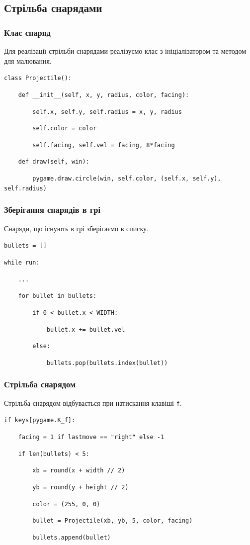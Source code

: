 \subsection{Стрільба снарядами}
\begin{frame}
\frametitle{Клас снаряд}
Для реалізації стрільби снарядами реалізуємо клас з ініціалізатором та методом для малювання.

\texttt{class Projectile():}

\texttt{~~~~def \_\_init\_\_(self, x, y, radius, color, facing):}

\texttt{~~~~~~~~self.x, self.y, self.radius = x, y, radius}

\texttt{~~~~~~~~self.color = color}

\texttt{~~~~~~~~self.facing, self.vel = facing, 8*facing}

\texttt{~~~~def draw(self, win):}

\texttt{~~~~~~~~pygame.draw.circle(win, self.color, (self.x, self.y), self.radius)}
\end{frame}

\begin{frame}
\frametitle{Зберігання снарядів в грі}
Снаряди, що існують в грі зберігаємо в списку.

\texttt{bullets = []}

\texttt{while run:}

\texttt{~~~~...}

\texttt{~~~~for bullet in bullets:}

\texttt{~~~~~~~~if 0 < bullet.x < WIDTH:}

\texttt{~~~~~~~~~~~~bullet.x += bullet.vel}

\texttt{~~~~~~~~else:}

\texttt{~~~~~~~~~~~~bullets.pop(bullets.index(bullet))}
\end{frame}

\begin{frame}
\frametitle{Стрільба снарядом}
Стрільба снарядом відбувається при натискання клавіші \texttt{f}.

\texttt{if keys[pygame.K\_f]:}

\texttt{~~~~facing = 1 if lastmove == "right"~else -1}

\texttt{~~~~if len(bullets) < 5:}

\texttt{~~~~~~~~xb = round(x + width // 2)}

\texttt{~~~~~~~~yb = round(y + height // 2)}

\texttt{~~~~~~~~color = (255, 0, 0)}

\texttt{~~~~~~~~bullet = Projectile(xb, yb, 5, color, facing)}

\texttt{~~~~~~~~bullets.append(bullet)}
\end{frame}

